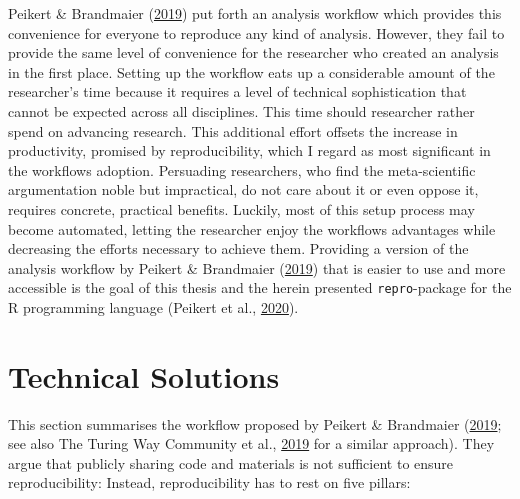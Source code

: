 \documentclass[12pt,a4paper,twoside]{article}
\begin{document}
Peikert \& Brandmaier (\protect\hyperlink{ref-peikertReproducibleDataAnalysis2019}{2019}) put forth an analysis workflow which provides this convenience for everyone to reproduce any kind of analysis.
However, they fail to provide the same level of convenience for the researcher who created an analysis in the first place.
Setting up the workflow eats up a considerable amount of the researcher's time because it requires a level of technical sophistication that cannot be expected across all disciplines. This time should researcher rather spend on advancing research.
This additional effort offsets the increase in productivity, promised by reproducibility, which I regard as most significant in the workflows adoption.
Persuading researchers, who find the meta-scientific argumentation noble but impractical, do not care about it or even oppose it, requires concrete, practical benefits.
Luckily, most of this setup process may become automated, letting the researcher enjoy the workflows advantages while decreasing the efforts necessary to achieve them.
Providing a version of the analysis workflow by Peikert \& Brandmaier (\protect\hyperlink{ref-peikertReproducibleDataAnalysis2019}{2019}) that is easier to use and more accessible is the goal of this thesis and the herein presented \texttt{repro}-package for the R programming language (Peikert et al., \protect\hyperlink{ref-R-repro}{2020}).

\hypertarget{technical-solutions}{%
\section{Technical Solutions}\label{technical-solutions}}

This section summarises the workflow proposed by Peikert \& Brandmaier (\protect\hyperlink{ref-peikertReproducibleDataAnalysis2019}{2019}; see also The Turing Way Community et al., \protect\hyperlink{ref-theturingwaycommunityTuringWayHandbook2019}{2019} for a similar approach).
They argue that publicly sharing code and materials is not sufficient to ensure reproducibility:
Instead, reproducibility has to rest on five pillars:
\end{document}
